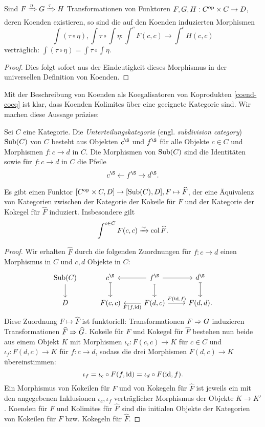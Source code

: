 \begin{lemma}
  Sind $F \xRightarrow{\eta} G \xRightarrow{\tau} H$ Transformationen
  von Funktoren $F, G, H: C^\mathrm{op} \times C \to D$, deren Koenden
  existieren, so sind die auf den Koenden induzierten Morphismen
  \[ \int (\tau \circ \eta), \int \tau \circ \int \eta:
  \int^c F(c, c) \to \int^c H(c, c) \]
  verträglich: $\int (\tau \circ \eta) = \int \tau \circ \int \eta$.
\end{lemma}
\begin{proof}
  Dies folgt sofort aus der Eindeutigkeit dieses Morphismus in der
  universellen Definition von Koenden.
\end{proof}

Mit der Beschreibung von Koenden als Koegalisatoren von Koprodukten
\ref{coend-coeq} ist klar, dass Koenden Kolimites über eine geeignete
Kategorie sind. Wir machen diese Aussage präzise:
\begin{defn} \label{def:sub}
  Sei $C$ eine Kategorie. Die \emph{Unterteilungskategorie}
  (engl. \emph{subdivision category}) $\operatorname{Sub}(C)$ von $C$ besteht aus
  Objekten $c^\S$ und $f^\S$ für alle Objekte $c \in C$ und Morphismen
  $f: c \to d$ in $C$. Die Morphismen von $\operatorname{Sub}(C)$ sind die
  Identitäten sowie für $f: c \to d$ in $C$ die Pfeile
  \[ c^\S \from f^\S \to d^\S. \]
\end{defn}
\begin{prop} \label{coend-col}
  Es gibt einen Funktor $[C^\mathrm{op} \times C, D] \to [\operatorname{Sub}(C), D], F
  \mapsto \widehat{F}$, der eine Äquivalenz von Kategorien zwischen
  der Kategorie der Kokeile für $F$ und der Kategorie der Kokegel für
  $\widehat{F}$ induziert. Insbesondere gilt
  \[ \int^{c \in C} F(c, c) \xrightarrow[]{\sim} \operatorname{col} \widehat{F}. \]
\end{prop}
\begin{proof}
  Wir erhalten $\widehat{F}$ durch die folgenden Zuordnungen für $f: c \to
  d$ einen Morphismus in $C$ und $c, d$ Objekte in $C$:
  \[ \begin{tikzcd}
    \Sub(C) \arrow{d}
    & c^\S \arrow[mapsto]{d}
    & \arrow{l} f^\S \arrow[mapsto]{d} \arrow{r}
    & d^\S \arrow[mapsto]{d} \\
    D
    & F(c, c)
    & \arrow{l}{F(f, \id)} F(d, c) \arrow{r}{F(\id, f)}
    & F(d, d).
  \end{tikzcd} \]
  Diese Zuordnung $F \mapsto \widehat{F}$ ist funktoriell:
  Transformationen $F \Rightarrow G$ induzieren Transformationen
  $\widehat{F} \Rightarrow \widehat{G}$. Kokeile für $F$ und Kokegel für
  $\widehat{F}$ bestehen nun beide aus einem Objekt $K$ mit Morphismen
  $\iota_c: F(c, c) \to K$ für $c \in C$ und $\iota_f: F(d, c) \to K$
  für $f: c \to d$, sodass die drei Morphismen $F(d, c) \to K$
  übereinstimmen:
  \[ \iota_f = \iota_c \circ F(f, \operatorname{id}) = \iota_d \circ F(\operatorname{id}, f). \]
  Ein Morphismus von Kokeilen für $F$ und von Kokegeln für
  $\widehat{F}$ ist jeweils ein mit den angegebenen Inklusionen
  $\iota_c, \iota_f$ verträglicher Morphismus der Objekte $K \to
  K'$. Koenden für $F$ und Kolimites für $\widehat{F}$ sind die
  initialen Objekte der Kategorien von Kokeilen für $F$ bzw. Kokegeln
  für $\widehat{F}$.
\end{proof}
